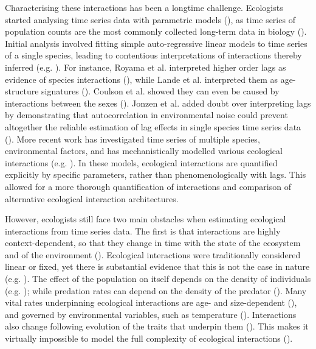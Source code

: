 \documentclass[11pt, oneside]{article}
\begin{document}
Characterising these interactions has been a longtime challenge. 
Ecologists started analysing time series data with parametric models (\cite{Royama1984,Kendall1999,Ives2003,Gross2005}), as time series of population counts are the most commonly collected long-term data in biology (\cite{Kendall1999}).
Initial analysis involved fitting simple auto-regressive linear models to time series of a single species, leading to contentious interpretations of interactions thereby inferred (e.g. \cite{Berryman1997}). 
For instance, Royama et al. interpreted higher order lags as evidence of species interactions (\cite{Royama1984}), while Lande et al. interpreted them as age-structure signatures (\cite{Lande2002}). 
Coulson et al. showed they can even be caused by interactions between the sexes (\cite{Mysterud2002}).
Jonzen et al. added doubt over interpreting lags by demonstrating that autocorrelation in environmental noise could prevent altogether the reliable estimation of lag effects in single species time series data (\cite{Jonzen2002}).
More recent work has investigated time series of multiple species, environmental factors, and has mechanistically modelled various ecological interactions (e.g. \cite{Bruijning2019,Rosenbaum2019,Adams2020}).
In these models, ecological interactions are quantified explicitly by specific parameters, rather than phenomenologically with lags.
This allowed for a more thorough quantification of interactions and comparison of alternative ecological interaction architectures.

However, ecologists still face two main obstacles when estimating ecological interactions from time series data.
The first is that interactions are highly context-dependent, so that they change in time with the state of the ecosystem and of the environment (\cite{Song2020}).
Ecological interactions were traditionally considered linear or fixed, yet there is substantial evidence that this is not the case in nature (e.g. \cite{Bonsall2003,Gross2005,Kendall2005,Ushio2018,Bruijning2019,Rosenbaum2019,Bonnaffe2021b}).
The effect of the population on itself depends on the density of individuals (e.g. \cite{Lingjaerde2001, Moe2005, Brook2006}); while predation rates can depend on the density of the predator (\cite{Jost2000,Yoshida2003}).
Many vital rates underpinning ecological interactions are age- and size-dependent (\cite{Bonnaffe2018,Bonnaffe2021b}), and governed by environmental variables, such as temperature (\cite{Brown2004a}).
Interactions also change following evolution of the traits that underpin them (\cite{Turchin2003,Yoshida2003}).
This makes it virtually impossible to model the full complexity of ecological interactions (\cite{Lawton1999,Kendall1999}).
\end{document}
